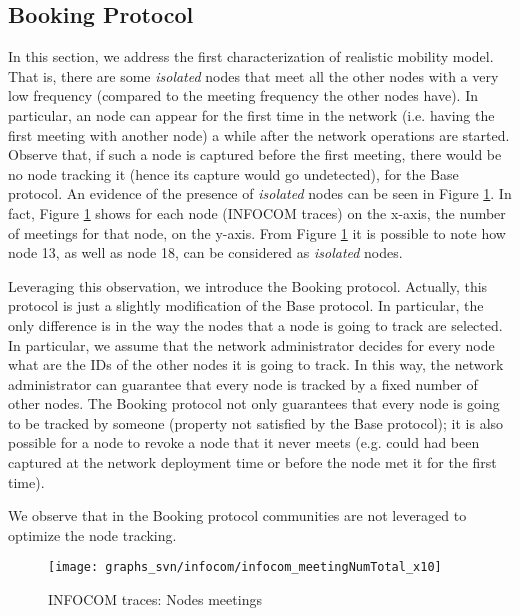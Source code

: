\documentclass{IEEEconf}
\begin{document}
\subsection{Booking Protocol}
\label{booking}

In this section, we address the first characterization of realistic mobility model.
That is, there are some \textit{isolated} nodes that meet all the other nodes with a very low frequency (compared to the meeting frequency the other nodes have).
In particular,
an  node can appear for the first time in the network (i.e. having the first meeting with another node) a while after the network operations are started.
Observe that, if such a node is captured before the first meeting, there would be no node tracking it (hence its capture would go undetected), for the Base protocol.
An evidence of the presence of \textit{isolated} nodes can be seen in Figure \ref{INFOCOM:meetings}. In fact, Figure \ref{INFOCOM:meetings} shows for each node (INFOCOM traces) on the x-axis, the number of meetings for that node, on the y-axis. From Figure \ref{INFOCOM:meetings} it is possible to note how node 13, as well as node 18, can be considered as \textit{isolated} nodes.

Leveraging  this observation, we introduce the Booking protocol.
Actually, this protocol is just a slightly modification of the Base protocol. In particular, the only difference is in the way the  nodes that a node is going to track are selected.
In particular, we assume that the network administrator decides for every node what are the IDs of the other nodes it is going to track. In this way, the network administrator can guarantee that every node is tracked by a fixed number of other nodes.
The Booking protocol not only guarantees that every node is going to be tracked by someone (property not satisfied by the Base protocol); it is also possible for a node  to revoke a node  that it never meets (e.g.  could had been captured at the network deployment time or before the node  met it for the first time).

We observe that in the Booking protocol communities are not  leveraged  to optimize the node tracking.




\begin{figure}
\begin{center}
\texttt{[image: graphs\_svn/infocom/infocom\_meetingNumTotal\_x10]}
\end{center}
\caption{\label{INFOCOM:meetings}INFOCOM traces: Nodes meetings}
\end{figure}
\end{document}
